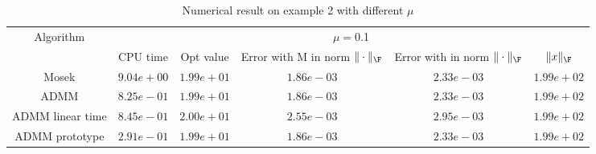 \begin{table}
\centering
\begin{tabular}{|c|c|c|c|c|c|}

\hline
\multirow{2}{*}{ Algorithm} &\multicolumn{5}{c|}{$\mu=$0.1}\\\cline{2-6}
 &CPU time &Opt value &Error with M in norm $\|\cdot\|_\F$ &Error with in norm $\|\cdot\|_\F$ &$\|x\|_\F$\\\hline
Mosek & $9.04e+00$ & $1.99e+01$ & $1.86e-03$ & $2.33e-03$ & $1.99e+02$\\\hline
ADMM & $8.25e-01$ & $1.99e+01$ & $1.86e-03$ & $2.33e-03$ & $1.99e+02$\\\hline
ADMM linear time & $8.45e-01$ & $2.00e+01$ & $2.55e-03$ & $2.95e-03$ & $1.99e+02$\\\hline
ADMM prototype & $2.91e-01$ & $1.99e+01$ & $1.86e-03$ & $2.33e-03$ & $1.99e+02$\\\hline
\end{tabular}
\caption{Numerical result on example 2 with different $\mu$\label{example2}}
\end{table}
